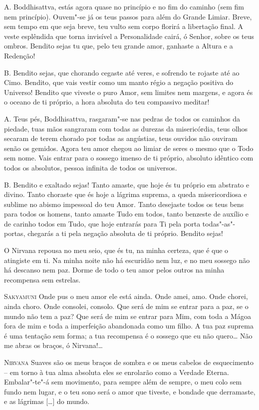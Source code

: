 \textsc{A.} Boddhisattva, estás agora quase no princípio e no fim do caminho
(sem fim nem princípio). Ouvem"-se já os teus passos para além do
Grande Limiar. Breve, sem tempo em que seja breve, teu vulto sem
corpo florirá a libertação final. A veste esplêndida que torna
invisível a Personalidade cairá, ó Senhor, sobre os teus ombros.
Bendito sejas tu que, pelo teu grande amor, ganhaste a Altura e a
Redenção!

\textsc{B.} Bendito sejas, que chorando cegaste até veres, e sofrendo te
rojaste até ao Cimo. Bendito, que vais vestir como um manto régio a
negação positiva do Universo! Bendito que viveste o puro Amor, sem
limites nem margens, e agora és o oceano de ti próprio, a hora
absoluta do teu compassivo meditar!

\textsc{A.} Teus pés, Boddhisattva, rasgaram"-se nas pedras de todos os caminhos
da piedade, tuas mãos sangraram com todas as durezas da misericórdia,
teus olhos secaram de terem chorado por todas as angústias, teus
ouvidos não ouviram senão os gemidos. Agora teu amor chegou ao limiar
de seres o mesmo que o Todo sem nome. Vais entrar para o sossego
imenso de ti próprio, absoluto idêntico com todos os absolutos,
pessoa infinita de todos os universos.

\textsc{B.} Bendito e exaltado sejas! Tanto amaste, que hoje és tu próprio em
abstrato e divino. Tanto choraste que és hoje a lágrima suprema, a
queda misericordiosa e sublime no abismo impessoal do teu Amor. Tanto
desejaste todos os teus bens para todos os homens, tanto amaste Tudo
em todos, tanto benzeste de auxílio e de carinho todos em Tudo, que
hoje entrarás para Ti pela porta todas"-as"-portas, chegarás a ti pela
negação absoluta de ti próprio. Bendito sejas!

O Nirvana repousa no meu seio, que és tu, na minha certeza, que é que
o atingiste em ti. Na minha noite não há escuridão nem luz, e no meu
sossego não há descanso nem paz. Dorme de todo o teu amor pelos
outros na minha recompensa sem estrelas.

\textsc{Sakyamuni} Onde pus o meu amor ele está ainda. Onde amei, amo. Onde
chorei, ainda choro. Onde consolei, consolo. Que será de mim se
entrar para a paz, se o mundo não tem a paz? Que será de mim se
entrar para Mim, com toda a Mágoa fora de mim e toda a imperfeição
abandonada como um filho. A tua paz suprema é uma tentação sem forma;
a tua recompensa é o sossego que eu não quero\ldots{} Não me abras os
braços, ó Nirvana!\ldots{}

\textsc{Nirvana} Suaves são os meus braços de sombra e os meus cabelos de
esquecimento -- em torno à tua alma absoluta eles se enrolarão como a
Verdade Eterna. Embalar"-te"-á sem movimento, para sempre além de
sempre, o meu colo sem fundo nem lugar, e o teu sono será o amor que
tiveste, e bondade que derramaste, e as lágrimas [\ldots{}] do mundo.

